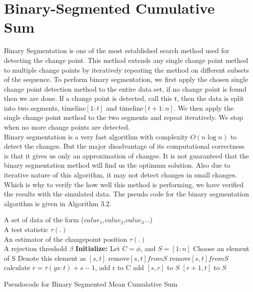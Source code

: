 \section{\label{section:Binary-Segmented Cumulative Sum}Binary-Segmented Cumulative Sum}
Binary Segmentation is one of the most established search method used for detecting the change point. This method extends any single change point method to multiple change points by iteratively repeating the method on different subsets of the sequence. 
To perform binary segmentation, we ﬁrst apply the chosen single change point detection method to the entire data set, if no change point is found then we are done. If a change point is detected, call this τ, then the data is split into two segments, timeline$[1:t]$ and timeline$[t+1:n]$. We then apply the single change point method to the two segments and repeat iteratively. We stop when no more change points are detected. 
\\Binary segmentation is a very fast algorithm with complexity $O(n\log n)$ to detect the changes. But the major disadvantage of its computational correctness is that it gives us only an approximation of changes. It is not guaranteed that the binary segmentation method will find us the optimum solution. Also due to iterative nature of this algorithm, it may not detect changes in small changes. Which is why to verify the how well this method is performing, we have verified the results with the simulated data. 
The pseudo code for the binary segmentation algorithm is given in Algorithm $3.2$. 

\begin{algorithm}[!h]
	\begin{algorithmic}[1]
		 \State \algorithmicrequire A set of data of the form ($value_1$,$value_2$,$value_3$...)\\
		\qquad\quad\enspace A test statistic $\tau(.)$\\
		\qquad\quad\enspace An estimator of the changepoint position $\tau(.)$\\
		\qquad\quad\enspace A rejection threshold $\beta$
		\State\textbf{Initialize:} Let $C=\phi$, and $S=[1:n]$
			\State Choose an element of S
			\State Denote this element as $[s,t]$
				\State remove$[s,t] from S$
			\EndIf
				\State remove$[s,t] from S$
				\State calculate $ r=\tau(ys:t)+s-1 $, 
				\State add r to C
					\State add $[s,r]$ to $S$
				\EndIf
					\State $[r+1,t]$ to $S$
				\EndIf
			\EndIf
		\EndWhile	
		\caption{Pseudocode for Binary Segmented Mean Cumulative Sum}
		\label{Pseudocode for Binary Segmented Mean Cumulative Sum}
	\end{algorithmic}
\end{algorithm}

